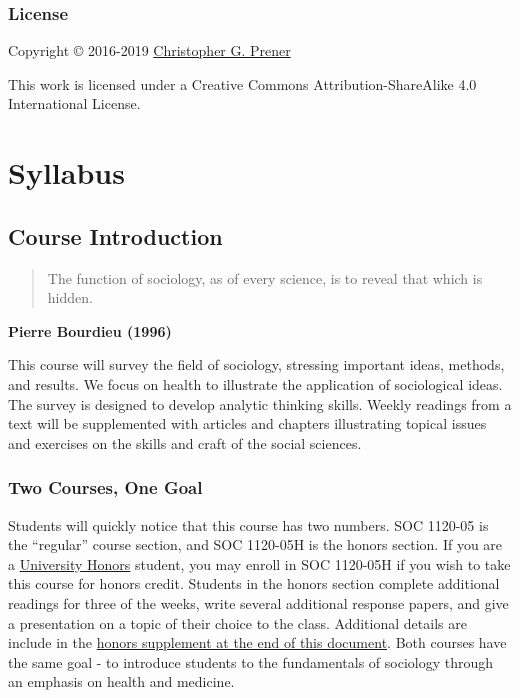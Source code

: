 \documentclass[]{book}
\begin{document}
\hypertarget{license}{%
\section*{License}\label{license}}

Copyright © 2016-2019 \href{https://chris-prener.github.io}{Christopher G. Prener}

This work is licensed under a Creative Commons Attribution-ShareAlike 4.0 International License.

\hypertarget{part-syllabus}{%
\part{Syllabus}\label{part-syllabus}}

\hypertarget{course-introduction}{%
\chapter{Course Introduction}\label{course-introduction}}

\begin{quote}
The function of sociology, as of every science, is to reveal that which is hidden.
\end{quote}

\textbf{Pierre Bourdieu (1996)}

This course will survey the field of sociology, stressing important ideas, methods, and results. We focus on health to illustrate the application of sociological ideas. The survey is designed to develop analytic thinking skills. Weekly readings from a text will be supplemented with articles and chapters illustrating topical issues and exercises on the skills and craft of the social sciences.

\hypertarget{two-courses-one-goal}{%
\section{Two Courses, One Goal}\label{two-courses-one-goal}}

Students will quickly notice that this course has two numbers. SOC 1120-05 is the ``regular'' course section, and SOC 1120-05H is the honors section. If you are a \href{https://www.slu.edu/honors/index.php}{University Honors} student, you may enroll in SOC 1120-05H if you wish to take this course for honors credit. Students in the honors section complete additional readings for three of the weeks, write several additional response papers, and give a presentation on a topic of their choice to the class. Additional details are include in the \href{/honors-overview.html}{honors supplement at the end of this document}. Both courses have the same goal - to introduce students to the fundamentals of sociology through an emphasis on health and medicine.
\end{document}
